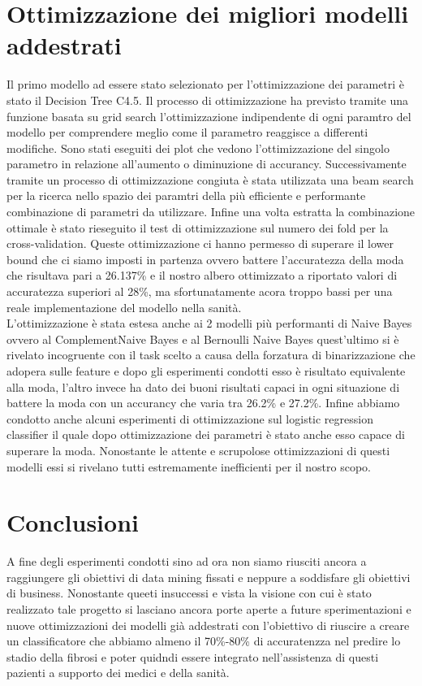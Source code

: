 \documentclass[italian,12pt,a4paper]{article}
\begin{document}
    \section{Ottimizzazione dei migliori modelli addestrati}
    Il primo modello ad essere stato selezionato per l'ottimizzazione dei parametri è stato il Decision Tree C4.5. Il processo di ottimizzazione ha previsto tramite una funzione basata su grid search l'ottimizzazione indipendente di ogni paramtro del modello per comprendere meglio come il parametro reaggisce a differenti modifiche. Sono stati eseguiti dei plot che vedono l'ottimizzazione del singolo parametro in relazione all'aumento o diminuzione di accurancy. Successivamente tramite un processo di ottimizzazione congiuta è stata utilizzata una beam search per la ricerca nello spazio dei paramtri della più efficiente e performante combinazione di parametri da utilizzare. Infine una volta estratta la combinazione ottimale è stato rieseguito il test di ottimizzazione sul numero dei fold per la cross-validation. Queste ottimizzazione ci hanno permesso di superare il lower bound che ci siamo imposti in partenza ovvero battere l'accuratezza della moda che risultava pari a 26.137\% e il nostro albero ottimizzato a riportato valori di accuratezza superiori al 28\%, ma sfortunatamente acora troppo bassi per una reale implementazione del modello nella sanità.
    \\

    L'ottimizzazione è stata estesa anche ai 2 modelli più performanti di Naive Bayes ovvero al ComplementNaive Bayes e al Bernoulli Naive Bayes quest'ultimo si è rivelato incogruente con il task scelto a causa della forzatura di binarizzazione che adopera sulle feature e dopo gli esperimenti condotti esso è risultato equivalente alla moda, l'altro invece ha dato dei buoni risultati capaci in ogni situazione di battere la moda con un accurancy che varia tra 26.2\% e 27.2\%. Infine abbiamo condotto anche alcuni esperimenti di ottimizzazione sul logistic regression classifier il quale dopo ottimizzazione dei parametri è stato anche esso capace di superare la moda. Nonostante le attente e scrupolose ottimizzazioni di questi modelli essi si rivelano tutti estremamente inefficienti per il nostro scopo.
    \\
    \vspace{25pt}

	\section{Conclusioni}
	A fine degli esperimenti condotti sino ad ora non siamo riusciti ancora a raggiungere gli obiettivi di data mining fissati e neppure a soddisfare gli obiettivi di business. Nonostante queeti insuccessi e vista la visione con cui è stato realizzato tale progetto si lasciano ancora porte aperte a future sperimentazioni e nuove ottimizzazioni dei modelli già addestrati con l'obiettivo di riuscire a creare un classificatore che abbiamo almeno il 70\%-80\% di accuratenzza nel predire lo stadio della fibrosi e poter quidndi essere integrato nell'assistenza di questi pazienti a supporto dei medici e della sanità. 
	
\end{document}
